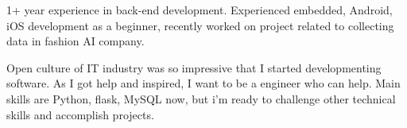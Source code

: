 

\begin{cvparagraph}

1+ year experience in back-end development. Experienced embedded, Android, iOS development as a beginner, recently worked on project related to collecting data in fashion AI company. 

Open culture of IT industry was so impressive that I started developmenting software. As I got help and inspired, I want to be a engineer who can help.
Main skills are Python, flask, MySQL now, but i'm ready to challenge other technical skills and accomplish projects.

\end{cvparagraph}
